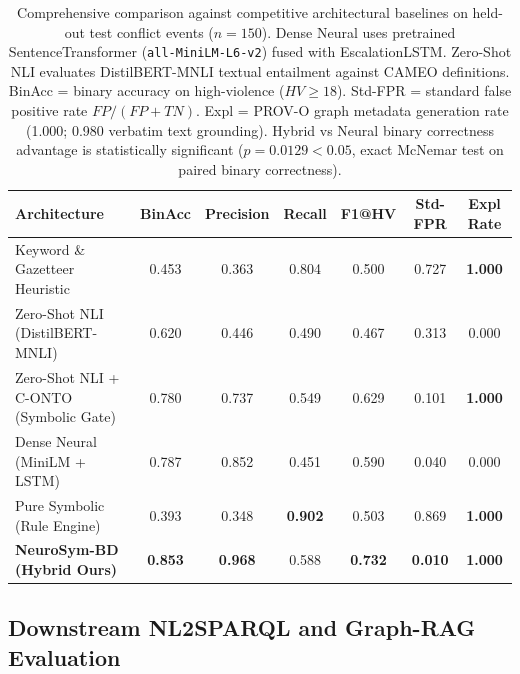 \documentclass[11pt,a4paper]{article}
\begin{document}
\begin{table}[h]
\centering
\small
\caption{Comprehensive comparison against competitive architectural baselines on held-out test conflict events ($n=150$).
Dense Neural uses pretrained SentenceTransformer (\texttt{all-MiniLM-L6-v2}) fused with EscalationLSTM. Zero-Shot NLI evaluates DistilBERT-MNLI textual entailment against CAMEO definitions.
BinAcc = binary accuracy on high-violence ($HV \ge 18$). Std-FPR = standard false positive rate $FP/(FP+TN)$. Expl = PROV-O graph metadata generation rate (1.000; 0.980 verbatim text grounding). Hybrid vs Neural binary correctness advantage is statistically significant ($p = 0.0129 < 0.05$, exact McNemar test on paired binary correctness).}
\label{tab:baselines}
\begin{tabular}{lcccccc}
\toprule
\textbf{Architecture} & \textbf{BinAcc} & \textbf{Precision} & \textbf{Recall} & \textbf{F1@HV} & \textbf{Std-FPR} & \textbf{Expl Rate} \\
\midrule
Keyword \& Gazetteer Heuristic            & 0.453 & 0.363 & 0.804 & 0.500 & 0.727 & \textbf{1.000} \\
Zero-Shot NLI (DistilBERT-MNLI)           & 0.620 & 0.446 & 0.490 & 0.467 & 0.313 & 0.000 \\
Zero-Shot NLI + C-ONTO (Symbolic Gate)    & 0.780 & 0.737 & 0.549 & 0.629 & 0.101 & \textbf{1.000} \\
Dense Neural (MiniLM + LSTM)              & 0.787 & 0.852 & 0.451 & 0.590 & 0.040 & 0.000 \\
Pure Symbolic (Rule Engine)               & 0.393 & 0.348 & \textbf{0.902} & 0.503 & 0.869 & \textbf{1.000} \\
\textbf{NeuroSym-BD (Hybrid Ours)}        & \textbf{0.853} & \textbf{0.968} & 0.588 & \textbf{0.732} & \textbf{0.010} & \textbf{1.000} \\
\bottomrule
\end{tabular}
\end{table}

\subsection{Downstream NL2SPARQL and Graph-RAG Evaluation}
\label{sec:nl2sparql}
\end{document}
